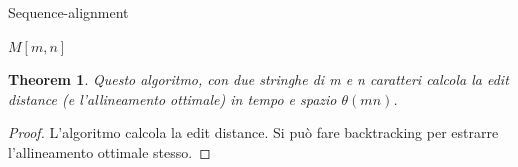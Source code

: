 \documentclass{article}
\newtheorem{theorem}{Theorem}[subsection]
\begin{document}
\begin{center}
\begin{algorithm}
\caption{Sequence-alignment}
\Return $M[m, n]$\;
\end{algorithm}
\end{center}
\begin{theorem}
    Questo algoritmo, con due stringhe di m e n caratteri calcola la edit distance (e l'allineamento ottimale) in tempo e spazio $\theta(mn)$.
\end{theorem}
\begin{proof}
    L'algoritmo calcola la edit distance. Si può fare backtracking per estrarre l'allineamento ottimale stesso.
\end{proof}
\end{document}
